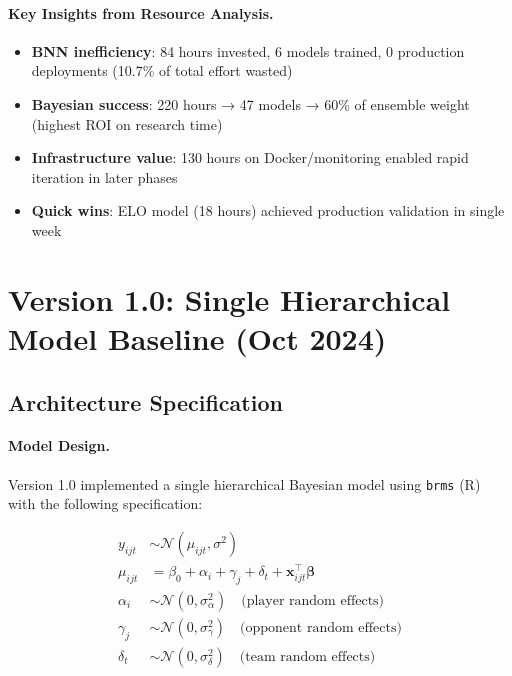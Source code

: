 \paragraph{Key Insights from Resource Analysis.}
\begin{itemize}[itemsep=2pt,parsep=0pt]
    \item \textbf{BNN inefficiency}: 84 hours invested, 6 models trained, 0 production deployments (10.7\% of total effort wasted)
    \item \textbf{Bayesian success}: 220 hours → 47 models → 60\% of ensemble weight (highest ROI on research time)
    \item \textbf{Infrastructure value}: 130 hours on Docker/monitoring enabled rapid iteration in later phases
    \item \textbf{Quick wins}: ELO model (18 hours) achieved production validation in single week
\end{itemize}

\section{Version 1.0: Single Hierarchical Model Baseline (Oct 2024)}
\label{sec:arch-v1}

\subsection{Architecture Specification}

\paragraph{Model Design.}
Version 1.0 implemented a single hierarchical Bayesian model using \texttt{brms} (R) with the following specification:

\begin{equation}
\label{eq:v1-hierarchical}
\begin{aligned}
y_{ijt} &\sim \mathcal{N}(\mu_{ijt}, \sigma^2) \\
\mu_{ijt} &= \beta_0 + \alpha_i + \gamma_j + \delta_t + \mathbf{x}_{ijt}^\top \boldsymbol{\beta} \\
\alpha_i &\sim \mathcal{N}(0, \sigma_{\alpha}^2) \quad \text{(player random effects)} \\
\gamma_j &\sim \mathcal{N}(0, \sigma_{\gamma}^2) \quad \text{(opponent random effects)} \\
\delta_t &\sim \mathcal{N}(0, \sigma_{\delta}^2) \quad \text{(team random effects)}
\end{aligned}
\end{equation}

